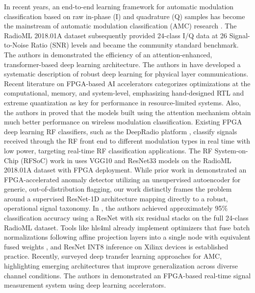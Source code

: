 \documentclass[conference]{IEEEtran}
\begin{document}
In recent years, an end-to-end learning framework for automatic modulation classification based on raw in-phase (I) and quadrature (Q) samples has become the mainstream of automatic modulation classification (AMC) research \cite{b1, b2}. %
The RadioML 2018.01A dataset \cite{b3} subsequently provided 24-class I/Q data at 26 Signal-to-Noise Ratio (SNR) levels and became the community standard benchmark. The authors in \cite{b4} demonstrated the efficiency of an attention-enhanced, transformer-based deep learning architecture. The authors in \cite{b5} have developed a systematic description of robust deep learning for physical layer communications.
Recent literature on FPGA-based AI accelerators \cite{b6} categorizes optimizations at the computational, memory, and system-level, emphasizing hand-designed RTL and extreme quantization as key for performance in resource-limited systems. Also, the authors in \cite{b7} proved that the models built using the attention mechanism obtain much better performance on wireless modulation classification.
Existing FPGA deep learning RF classifiers, such as the DeepRadio platform \cite{b8}, classify signals received through the RF front end to different modulation types in real time with low power, targeting real-time RF classification applications. The RF System-on-Chip (RFSoC) work in \cite{b9} uses VGG10 and ResNet33 models on the RadioML 2018.01A dataset with FPGA deployment. While prior work in \cite{b10} demonstrated an FPGA-accelerated anomaly detector utilizing an unsupervised autoencoder for generic, out-of-distribution flagging, our work distinctly frames the problem around a supervised ResNet-1D architecture mapping directly to a robust, operational signal taxonomy. In \cite{b11}, the authors achieved approximately 95\% classification accuracy using a ResNet with six residual stacks on the full 24-class RadioML dataset. Tools like hls4ml already implement optimizers that fuse batch normalizations following affine projection layers into a single node with equivalent fused weights \cite{b12}, and ResNet INT8 inference on Xilinx devices is established practice. Recently, \cite{b13} surveyed deep transfer learning approaches for AMC, highlighting emerging architectures that improve generalization across diverse channel conditions. The authors in \cite{b14} demonstrated an FPGA-based real-time signal measurement system using deep learning accelerators.
\end{document}
